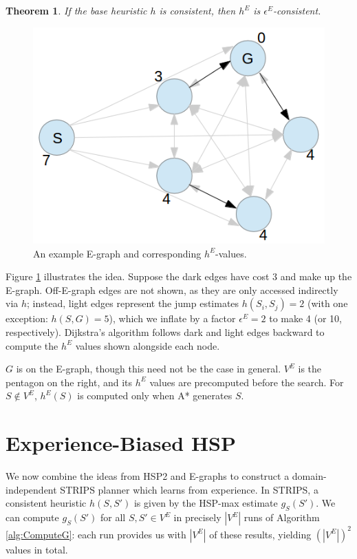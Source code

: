 \documentclass[letterpaper]{article}
\newtheorem{thm}{Theorem}
\begin{document}
\begin{thm} If the base heuristic $h$ is consistent, then $h^E$ is $\epsilon^E$-consistent. \cite{phillips2012graphs}\end{thm}

\begin{figure}
	\begin{center}
	\includegraphics[scale=0.5]{Pentagon.png}
	\end{center}
	\caption{An example E-graph and corresponding $h^E$-values.}
	\label{fig:example}
\end{figure}

Figure \ref{fig:example} illustrates the idea. Suppose the dark edges have cost 3 and make up the E-graph. Off-E-graph edges are not shown, as they are only accessed indirectly via $h$; instead, light edges represent the jump estimates $h(S_i,S_j) = 2$ (with one exception: $h(S,G) = 5$), which we inflate by a factor $\epsilon^E=2$ to make 4 (or 10, respectively). Dijkstra's algorithm follows dark and light edges backward to compute the $h^E$ values shown alongside each node.

$G$ is on the E-graph, though this need not be the case in general. $V^E$ is the pentagon on the right, and its $h^E$ values are precomputed before the search. For $S\notin V^E$, $h^E(S)$ is computed only when A* generates $S$.

\section{Experience-Biased HSP}

We now combine the ideas from HSP2 and E-graphs to construct a domain-independent STRIPS planner which learns from experience. In STRIPS, a consistent heuristic $h(S,S')$ is given by the HSP-max estimate $g_S(S')$. We can compute $g_S(S')$ for all $S,S'\in V^E$ in precisely $|V^E|$ runs of Algorithm \ref{alg:ComputeG}: each run provides us with $|V^E|$ of these results, yielding $(|V^E|)^2$ values in total.
\end{document}
